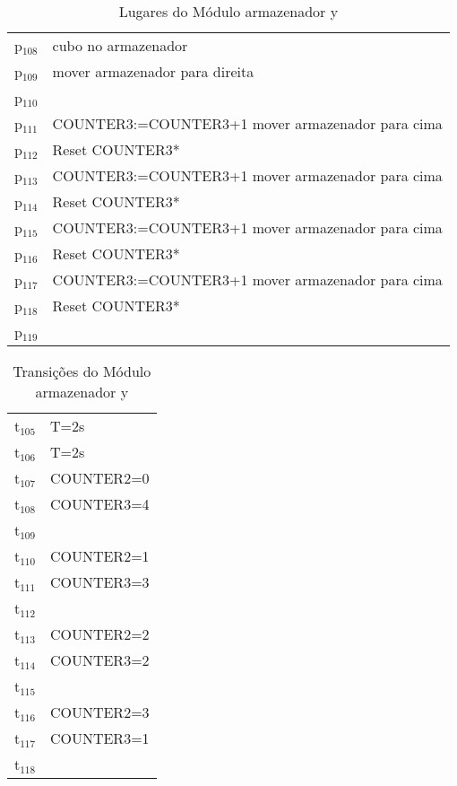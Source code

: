 \begin{table}[htbp]
\caption{Lugares do Módulo armazenador y}
\centering
\begin{tabular}{ll}
p\(_{\text{108}}\) & cubo no armazenador\\
p\(_{\text{109}}\) & mover armazenador para direita\\
p\(_{\text{110}}\) & \\
p\(_{\text{111}}\) & COUNTER3:=COUNTER3+1 mover armazenador para cima\\
p\(_{\text{112}}\) & Reset COUNTER3*\\
p\(_{\text{113}}\) & COUNTER3:=COUNTER3+1 mover armazenador para cima\\
p\(_{\text{114}}\) & Reset COUNTER3*\\
p\(_{\text{115}}\) & COUNTER3:=COUNTER3+1 mover armazenador para cima\\
p\(_{\text{116}}\) & Reset COUNTER3*\\
p\(_{\text{117}}\) & COUNTER3:=COUNTER3+1 mover armazenador para cima\\
p\(_{\text{118}}\) & Reset COUNTER3*\\
p\(_{\text{119}}\) & \\
\end{tabular}
\end{table}

\begin{table}[htbp]
\caption{Transições do Módulo armazenador y}
\centering
\begin{tabular}{ll}
t\(_{\text{105}}\) & T=2s\\
t\(_{\text{106}}\) & T=2s\\
t\(_{\text{107}}\) & COUNTER2=0\\
t\(_{\text{108}}\) & COUNTER3=4\\
t\(_{\text{109}}\) & \\
t\(_{\text{110}}\) & COUNTER2=1\\
t\(_{\text{111}}\) & COUNTER3=3\\
t\(_{\text{112}}\) & \\
t\(_{\text{113}}\) & COUNTER2=2\\
t\(_{\text{114}}\) & COUNTER3=2\\
t\(_{\text{115}}\) & \\
t\(_{\text{116}}\) & COUNTER2=3\\
t\(_{\text{117}}\) & COUNTER3=1\\
t\(_{\text{118}}\) & \\
\end{tabular}
\end{table}
